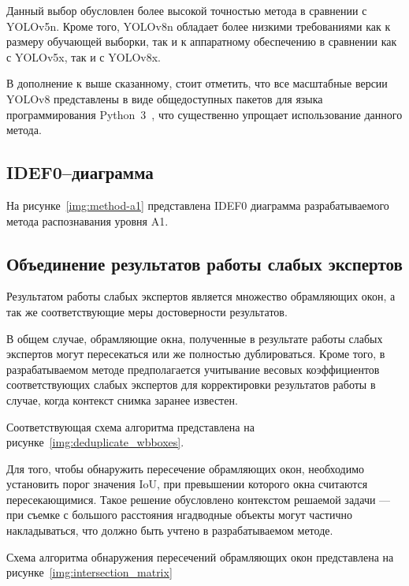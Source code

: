 Данный выбор обусловлен более высокой точностью метода в сравнении с YOLOv5n. Кроме того, YOLOv8n обладает более низкими требованиями как к размеру обучающей выборки, так и к аппаратному обеспечению в сравнении как с YOLOv5x, так и с YOLOv8x.

В дополнение к выше сказанному, стоит отметить, что все масштабные версии YOLOv8 представлены в виде общедоступных пакетов для языка программирования Python~3~\cite{python3}, что существенно упрощает использование данного метода.

\subsection{IDEF0–диаграмма}

На рисунке~\ref{img:method-a1} представлена IDEF0 диаграмма разрабатываемого метода распознавания уровня A1.


\subsection{Объединение результатов работы слабых экспертов}

Результатом работы слабых экспертов является множество обрамляющих окон, а так же соответствующие меры достоверности результатов.

В общем случае, обрамляющие окна, полученные в результате работы слабых экспертов могут пересекаться или же полностью дублироваться. Кроме того, в разрабатываемом методе предполагается учитывание весовых коэффициентов соответствующих слабых экспертов для корректировки результатов работы в случае, когда контекст снимка заранее известен.

\clearpage

Соответствующая схема алгоритма представлена на рисунке~\ref{img:deduplicate_wbboxes}.


Для того, чтобы обнаружить пересечение обрамляющих окон, необходимо установить порог значения IoU, при превышении которого окна считаются пересекающимися. Такое решение обусловлено контекстом решаемой задачи --- при съемке с большого расстояния нгадводные объекты могут частично накладываться, что должно быть учтено в разрабатываемом методе.

Схема алгоритма обнаружения пересечений обрамляющих окон представлена на рисунке~\ref{img:intersection_matrix}

